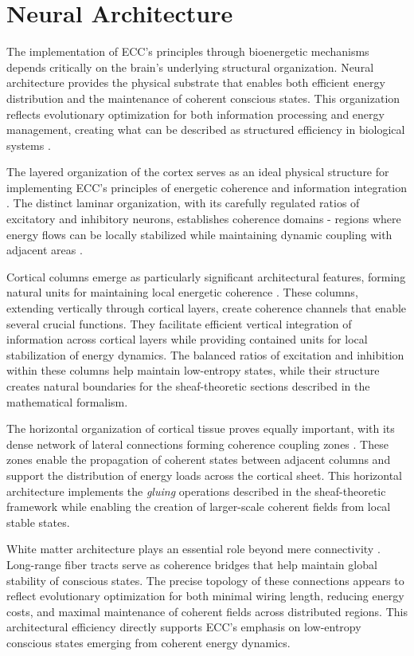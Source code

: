 \section{Neural Architecture}

The implementation of ECC's principles through bioenergetic mechanisms depends critically on the brain's underlying structural organization. Neural architecture provides the physical substrate that enables both efficient energy distribution and the maintenance of coherent conscious states. This organization reflects evolutionary optimization for both information processing and energy management, creating what can be described as structured efficiency in biological systems \cite{Hilgetag2020}.

The layered organization of the cortex serves as an ideal physical structure for implementing ECC's principles of energetic coherence and information integration \cite{Douglas2004}. The distinct laminar organization, with its carefully regulated ratios of excitatory and inhibitory neurons, establishes coherence domains - regions where energy flows can be locally stabilized while maintaining dynamic coupling with adjacent areas \cite{Harris2015}.

Cortical columns emerge as particularly significant architectural features, forming natural units for maintaining local energetic coherence \cite{Mountcastle1997}. These columns, extending vertically through cortical layers, create coherence channels that enable several crucial functions. They facilitate efficient vertical integration of information across cortical layers while providing contained units for local stabilization of energy dynamics. The balanced ratios of excitation and inhibition within these columns help maintain low-entropy states, while their structure creates natural boundaries for the sheaf-theoretic sections described in the mathematical formalism.

The horizontal organization of cortical tissue proves equally important, with its dense network of lateral connections forming coherence coupling zones \cite{DeFelipe2011}. These zones enable the propagation of coherent states between adjacent columns and support the distribution of energy loads across the cortical sheet. This horizontal architecture implements the \textit{gluing} operations described in the sheaf-theoretic framework while enabling the creation of larger-scale coherent fields from local stable states.

White matter architecture plays an essential role beyond mere connectivity \cite{Sporns2011}. Long-range fiber tracts serve as coherence bridges that help maintain global stability of conscious states. The precise topology of these connections appears to reflect evolutionary optimization for both minimal wiring length, reducing energy costs, and maximal maintenance of coherent fields across distributed regions. This architectural efficiency directly supports ECC's emphasis on low-entropy conscious states emerging from coherent energy dynamics.

